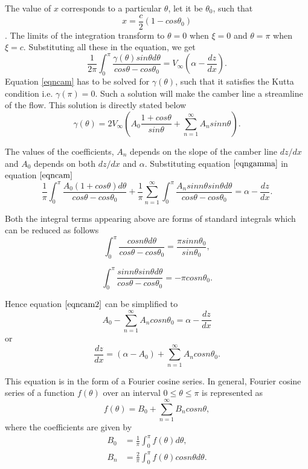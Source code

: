\documentclass[letterpaper,12pt]{article}
\begin{document}
The value of $x$ corresponds to a particular $\theta$, let it be $\theta_{0}$, such that 
\[x=\frac{c}{2}(1-cos\theta_{0})\].
The limits of the integration transform to $\theta=0$ when $\xi=0$ and $\theta=\pi$ when $\xi=c$.
Substituting all these in the equation, we get
\begin{equation}
\frac{1}{2\pi}\int_{0}^{\pi}\frac{\gamma(\theta)sin\theta d\theta}{cos\theta-cos\theta_{0}} = V_\infty\left(\alpha-\frac{dz}{dx}\right).
\label{eqncam}
\end{equation}
Equation \ref{eqncam} has to be solved for $\gamma(\theta)$, such that it satisfies the Kutta condition i.e. $\gamma(\pi)=0$. Such a solution will make the camber line a streamline of the flow. This solution is directly stated below
\begin{equation}\boxed{
\gamma(\theta)=2 V_\infty \left(A_{0}\frac{1+cos\theta}{sin\theta}+\sum_{n=1}^{\infty} A_{n}sinn\theta\right).
}
\label{eqngamma}
\end{equation}

The values of the coefficients, $A_{n}$ depends on the slope of the camber line $dz/dx$ and $A_{0}$ depends on both $dz/dx$ and $\alpha$.
Substituting equation $\ref{eqngamma}$ in equation $\ref{eqncam}$
\begin{equation}
\frac{1}{\pi}\int_0^\pi\frac{A_0(1+cos\theta) d\theta}{cos\theta-cos\theta_0}+\frac{1}{\pi}\sum_{n=1}^{\infty}\int_0^\pi\frac{A_n sinn\theta sin\theta d\theta}{cos\theta-cos\theta_0} = \alpha - \frac{dz}{dx}.
\label{eqncam2}
\end{equation}

Both the integral terms appearing above are forms of standard integrals which can be reduced as follows
\begin{equation}
\int_0^\pi\frac{cosn\theta d\theta}{cos\theta-cos\theta_0} = \frac{\pi sinn\theta_0}{sin\theta_0},
\end{equation}

\begin{equation}
\int_0^\pi\frac{sinn\theta sin\theta d\theta}{cos\theta-cos\theta_0} = -\pi cosn\theta_0.
\end{equation}

Hence equation $\ref{eqncam2}$ can be simplified to
\[
A_0 - \sum_{n=1}^{\infty}A_n cosn\theta_0 = \alpha - \frac{dz}{dx}
\]
or
\begin{equation}
\frac{dz}{dx} = (\alpha-A_0) + \sum_{n=1}^{\infty}A_n cosn\theta_0.
\label{dz}
\end{equation}

This equation is in the form of a Fourier cosine series. In general, Fourier cosine series of a function $f(\theta)$ over an interval $0\leq\theta\leq\pi$ is represented as
\begin{equation}
f(\theta) = B_0 + \sum_{n=1}^\infty B_n cosn\theta,
\end{equation}
where the coefficients are given by
\begin{align*}
B_0 &= \frac{1}{\pi}\int_0^\pi f(\theta) d\theta,\\
B_n &= \frac{2}{\pi}\int_0^\pi f(\theta) cosn\theta d\theta.
\end{align*}
\end{document}
